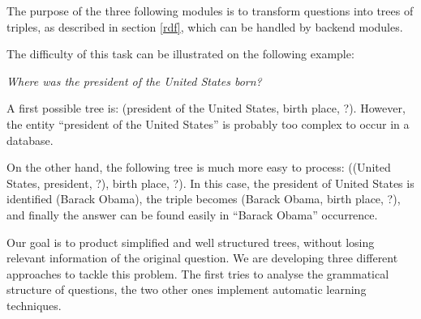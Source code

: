 
The purpose of the three following modules is to transform questions into trees of triples, as described in section \ref{rdf}, which can be handled by backend modules.

The difficulty of this task can be illustrated on the following example: 
\begin{center}
 \textit{Where was the president of the United States born?}
\end{center}

A first possible tree is: (president of the United States, birth place, ?). However, the entity ``president of the United States'' is probably too complex to occur in a database. 

On the other hand, the following tree is much more easy to process: ((United States, president, ?), birth place, ?). In this case, the president of United States is identified (Barack Obama), the triple becomes (Barack Obama, birth place, ?), and finally the answer can be found easily in ``Barack Obama'' occurrence.

Our goal is to product simplified and well structured trees, without losing relevant information of the original question. We are developing three different approaches to tackle this problem. The first tries to analyse the grammatical structure of questions, the two other ones implement automatic learning techniques.